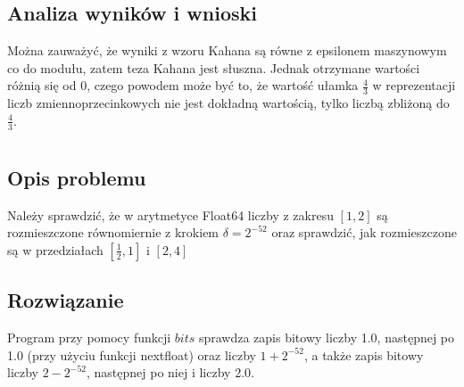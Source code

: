 \documentclass[11pt]{article}
\theoremstyle{remark}
\begin{document}
\subsection{Analiza wyników i wnioski}
Można zauważyć, że wyniki z wzoru Kahana są równe z epsilonem maszynowym co do modułu, zatem teza Kahana jest słuszna. Jednak otrzymane wartości różnią się od $0$, czego powodem może być to, że wartość ułamka $\frac{4}{3}$ w reprezentacji liczb zmiennoprzecinkowych nie jest dokładną wartością, tylko liczbą zbliżoną do $\frac{4}{3}$.
\section{}
\subsection{Opis problemu}
Należy sprawdzić, że w arytmetyce Float64 liczby z zakresu $[1,2]$ są rozmieszczone równomiernie z krokiem $\delta=2^{-52}$ oraz sprawdzić, jak rozmieszczone są w przedziałach $[\frac{1}{2}, 1]$ i $[2,4]$
\subsection{Rozwiązanie}
Program  przy pomocy funkcji $bits$ sprawdza zapis bitowy  liczby 1.0, następnej po 1.0 (przy użyciu funkcji nextfloat) oraz liczby $1+2^{-52}$, a także zapis bitowy liczby $2-2^{-52}$, następnej po niej i liczby 2.0.
\end{document}
